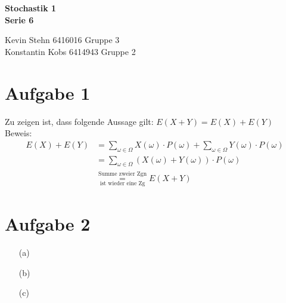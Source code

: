 \documentclass[10pt,a4paper]{article}
\begin{document}
\begin{center}
\textbf{Stochastik 1 \\ Serie 6\\}
\end{center}

\begin{flushright}
Kevin Stehn 6416016 Gruppe 3 \\
Konstantin Kobs 6414943 Gruppe 2
\end{flushright}

\section*{Aufgabe 1}
Zu zeigen ist, dass folgende Aussage gilt: $E(X+Y) = E(X) + E(Y)$\\
Beweis:
\begin{align*}
E(X) + E(Y) &= \sum_{\omega \in \Omega} X(\omega) \cdot P({\omega}) + \sum_{\omega \in \Omega} Y(\omega) \cdot P({\omega})\\
&= \sum_{\omega \in \Omega} (X(\omega) + Y(\omega)) \cdot P({\omega})\\
&\overset{\text{Summe zweier Zgn}}{\underset{\text{ist wieder eine Zg}}{=}} E(X+Y)
\end{align*}

\section*{Aufgabe 2}
\begin{itemize}
\item[(a)]
\item[(b)]
\item[(c)]
\end{itemize}
\end{document}
